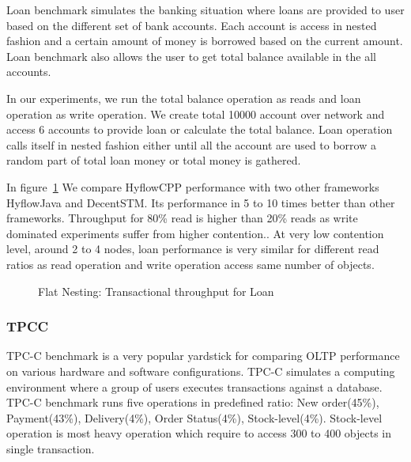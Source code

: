 \documentclass[12pt,english]{report}
\begin{document}
Loan benchmark simulates the banking situation where loans are provided to user based on the different set of bank accounts. Each account is access in nested fashion and a certain amount of money is borrowed based on the current amount. Loan benchmark also allows the user to get total balance available in the all accounts.

In our experiments, we run the total balance operation as reads and loan operation as write operation. We create total 10000 account over network and access 6 accounts to provide loan or calculate the total balance.
Loan operation calls itself in nested fashion either until all the account are used to borrow a random part of total loan money or total money is gathered.

In figure~\ref{Fig:flatLoan} We compare HyflowCPP performance with two other frameworks HyflowJava and DecentSTM. Its performance in 5 to 10 times better than other frameworks. Throughput for 80\% read is higher than 20\% reads as write dominated experiments suffer from higher contention.. At very low contention level, around 2 to 4 nodes, loan performance is very similar for different read ratios as read operation and write operation access same number of objects. 

\begin{figure}[H]
\centering
{}
\end{figure}
\begin{figure}[H]
\centering
{}
\end{figure}

\begin{figure}[H]
\centering
{}
\caption{Flat Nesting: Transactional throughput for Loan}
\label{Fig:flatLoan}
\end{figure}

\subsubsection{TPCC}

TPC-C benchmark is a very popular yardstick for comparing OLTP performance on various hardware and software configurations. TPC-C simulates a computing environment where a group of users executes transactions against a database. TPC-C benchmark runs five operations in predefined ratio: New order(45\%), Payment(43\%), Delivery(4\%), Order Status(4\%), Stock-level(4\%). Stock-level operation is most heavy operation which require to access 300 to 400 objects in single transaction. 
\end{document}
